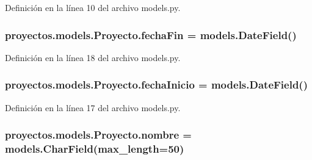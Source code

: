 Definición en la línea 10 del archivo models.\+py.

\subsubsection[{\texorpdfstring{fecha\+Fin}{fechaFin}}]{\setlength{\rightskip}{0pt plus 5cm}proyectos.\+models.\+Proyecto.\+fecha\+Fin = models.\+Date\+Field()\hspace{0.3cm}{\ttfamily [static]}}\hypertarget{classproyectos_1_1models_1_1_proyecto_acee41eb9e758a1bc0ded9f009a67aa04}{}\label{classproyectos_1_1models_1_1_proyecto_acee41eb9e758a1bc0ded9f009a67aa04}


Definición en la línea 18 del archivo models.\+py.

\subsubsection[{\texorpdfstring{fecha\+Inicio}{fechaInicio}}]{\setlength{\rightskip}{0pt plus 5cm}proyectos.\+models.\+Proyecto.\+fecha\+Inicio = models.\+Date\+Field()\hspace{0.3cm}{\ttfamily [static]}}\hypertarget{classproyectos_1_1models_1_1_proyecto_a5e8ca5da89095206f3bd85e43e5277a2}{}\label{classproyectos_1_1models_1_1_proyecto_a5e8ca5da89095206f3bd85e43e5277a2}


Definición en la línea 17 del archivo models.\+py.

\subsubsection[{\texorpdfstring{nombre}{nombre}}]{\setlength{\rightskip}{0pt plus 5cm}proyectos.\+models.\+Proyecto.\+nombre = models.\+Char\+Field(max\+\_\+length=50)\hspace{0.3cm}{\ttfamily [static]}}\hypertarget{classproyectos_1_1models_1_1_proyecto_a9adee55c9a87f8d6caca1a59cbc2e51e}{}\label{classproyectos_1_1models_1_1_proyecto_a9adee55c9a87f8d6caca1a59cbc2e51e}


